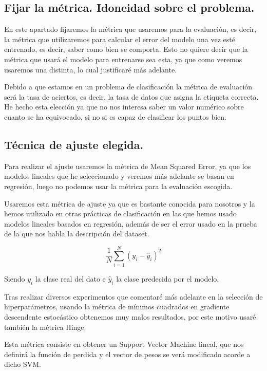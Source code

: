\documentclass[12pt, spanish]{article}
\begin{document}
\subsection{Fijar la métrica. Idoneidad sobre el problema.}

En este apartado fijaremos la métrica que usaremos para la evaluación, es decir, la métrica que utilizaremos para calcular el error del modelo una vez esté entrenado, es decir, saber como bien se comporta. Esto no quiere decir que la métrica que usará el modelo para entrenarse sea esta, ya que como veremos usaremos una distinta, lo cual justificaré más adelante.

Debido a que estamos en un problema de clasificación la métrica de evaluación será la tasa de aciertos, es decir, la tasa de datos que asigna la etiqueta correcta. He hecho esta elección ya que no nos interesa saber un valor numérico sobre cuanto se ha equivocado, si no si es capaz de clasificar los puntos bien.



\subsection{Técnica de ajuste elegida.}

Para realizar el ajuste usaremos la métrica de Mean Squared Error, ya que los modelos lineales que he seleccionado y veremos más adelante se basan en regresión, luego no podemos usar la métrica para la evaluación escogida. 

Usaremos esta métrica de ajuste ya que es bastante conocida para nosotros y la hemos utilizado en otras prácticas de clasificación en las que hemos usado modelos lineales basados en regresión, además de ser el error usado en la prueba de la que nos habla la descripción del dataset.


$$ \frac{1}{N} \sum_{i=1}^{N}{(y_i - \hat{y}_i)^2} $$

Siendo $y_i$ la clase real del dato e $\hat{y}_i$ la clase predecida por el modelo.

Tras realizar diversos experimentos que comentaré más adelante en la selección de hiperparámetros, usando la métrica de mínimos cuadrados en gradiente descendente estocástico obtenemos muy malos resultados, por este motivo usaré también la métrica Hinge\cite{hingeLoss}.

Esta métrica consiste en obtener un Support Vector Machine lineal, que nos definirá la función de perdida y el vector de pesos se verá modificado acorde a dicho SVM.
\end{document}

